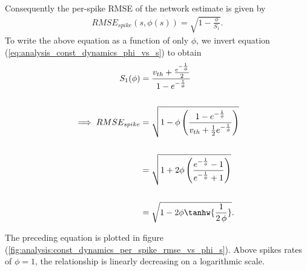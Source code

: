 \begin{enumerate}
Consequently the per-spike RMSE of the network estimate is given by 
\begin{align}
\label{eq:analysis:const_dynamics_per_spike_rmse_phi_s}
RMSE_{spike}(s, \phi(s)) = \sqrt
{
	1 - 
	\frac
	{
		\phi
	}
	{
		S_1
	}
}.
\end{align}
To write the above equation as a function of only $\phi$, we invert equation (\ref{eq:analysis_const_dynamics_phi_vs_s}) to obtain 
\begin{align}
\label{eq:analysis:const_dynamics_per_spike_rmse_phi}
S_1(\phi) &= 
\frac
{
	v_{th} +
	\frac
	{
		e^
		{
			-\frac
			{
				1
			}
			{
				\phi
			}
		}
	}
	{
		2
	}
}
{
	1 - e^
	{
		-\frac
		{
			1
		}
		{
			\phi
		}
	}
}
\notag
%
\\
\notag
\\
%
\implies
RMSE_{spike} 
&= 
\sqrt
{
	1 - \phi 
	\left(
		\frac
		{
			1 - e^
			{
				-\frac
				{
					1	
				}
				{
					\phi
				}
			}
		}
		{
			v_{th} + 
			\frac
			{
				1
			}
			{
				2
			}
			e^
			{
				-\frac
				{
					1
				}
				{
					\phi
				}
			}
		}
	\right)
} \notag
%
%
\\  
\notag
\\
\notag
%
%
&= 
\sqrt
{
	1 + 2 \phi 
	\left(
		\frac
		{
			e^
			{
				-\frac
				{
					1	
				}
				{
					\phi
				}
			}
			- 1
		}
		{
			e^
			{
				-\frac
				{
					1
				}
				{
					\phi
				}
			}
			+ 1
		}
	\right)
}
\notag
\\
\notag
\\
&=\sqrt
{
	1 - 2 \phi
	\tanhw
	{
		\frac
		{
			1
		}
		{
			2 \, \phi
		}	
	}
}.
\end{align}

The preceding equation is plotted in figure (\ref{fig:analysis:const_dynamics_per_spike_rmse_vs_phi_s}). Above spikes rates of $\phi = 1$, the relationship is linearly decreasing on a logarithmic scale.


\end{enumerate}
